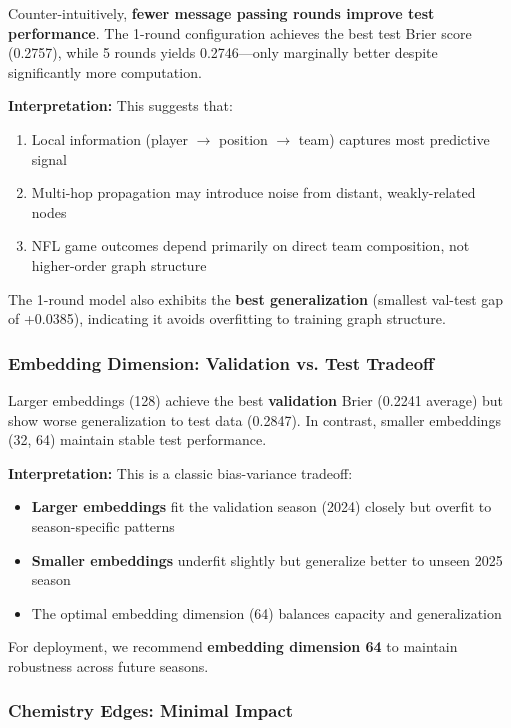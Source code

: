 Counter-intuitively, \textbf{fewer message passing rounds improve test performance}. The 1-round configuration achieves the best test Brier score (0.2757), while 5 rounds yields 0.2746—only marginally better despite significantly more computation.

\textbf{Interpretation:} This suggests that:
\begin{enumerate}[noitemsep]
    \item Local information (player $\rightarrow$ position $\rightarrow$ team) captures most predictive signal
    \item Multi-hop propagation may introduce noise from distant, weakly-related nodes
    \item NFL game outcomes depend primarily on direct team composition, not higher-order graph structure
\end{enumerate}

The 1-round model also exhibits the \textbf{best generalization} (smallest val-test gap of +0.0385), indicating it avoids overfitting to training graph structure.

\subsubsection{Embedding Dimension: Validation vs. Test Tradeoff}
\label{subsubsec:gnn_embedding_dim}

Larger embeddings (128) achieve the best \textbf{validation} Brier (0.2241 average) but show worse generalization to test data (0.2847). In contrast, smaller embeddings (32, 64) maintain stable test performance.

\textbf{Interpretation:} This is a classic bias-variance tradeoff:
\begin{itemize}[noitemsep]
    \item \textbf{Larger embeddings} fit the validation season (2024) closely but overfit to season-specific patterns
    \item \textbf{Smaller embeddings} underfit slightly but generalize better to unseen 2025 season
    \item The optimal embedding dimension (64) balances capacity and generalization
\end{itemize}

For deployment, we recommend \textbf{embedding dimension 64} to maintain robustness across future seasons.

\subsubsection{Chemistry Edges: Minimal Impact}
\label{subsubsec:gnn_chemistry}

